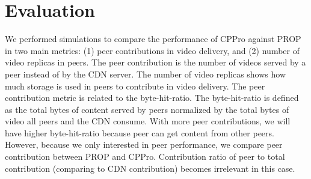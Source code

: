 \documentclass[10pt,final,journal,a4paper]{IEEEtran}
\begin{document}
\section{Evaluation}\label{evaluation}

We performed simulations to compare the performance of CPPro against PROP in two main metrics: (1) peer contributions in video delivery, and (2) number of video replicas in peers.
The peer contribution is the number of videos served by a peer instead of by the CDN server.
The number of video replicas shows how much storage is used in peers to contribute in video delivery.
The peer contribution metric is related to the byte-hit-ratio. 
The byte-hit-ratio is defined as the total bytes of content served by peers normalized by the total bytes of video all peers and the CDN consume.
With more peer contributions, we will have higher byte-hit-ratio because peer can get content from other peers. 
However, because we only interested in peer performance, we compare peer contribution between PROP and CPPro.
Contribution ratio of peer to total contribution (comparing to CDN contribution) becomes irrelevant in this case.


\end{document}
